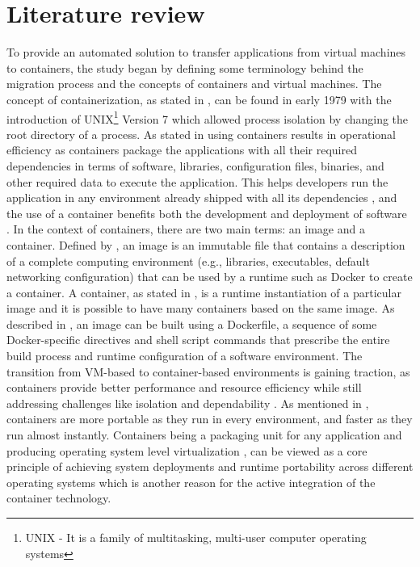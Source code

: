 \documentclass[twocolumn]{article}
\begin{document}
\section{Literature review}
To provide an automated solution to transfer applications from virtual machines to containers, the study began by defining some terminology behind the migration process and the concepts of containers and virtual machines.
The concept of containerization, as stated in \cite{Bhat-2022}, can be found in early 1979 with the introduction of UNIX\footnote{UNIX - It is a family of multitasking, multi-user computer operating systems} Version 7 which allowed process isolation by changing the root directory of a process. As stated in \cite{SiddiquiEtAl-2020} using containers results in operational efficiency as containers package the applications with all their required dependencies in terms of software, libraries, configuration files, binaries, and other required data to execute the application. This helps developers run the application in any environment already shipped with all its dependencies \cite{SiddiquiEtAl-2020}, and the use of a container benefits both the development and deployment of software \cite{VermaEtAl-2022}. In the context of containers, there are two main terms: an image and a container. Defined by \cite{HaleEtAl-2017}, an image is an immutable file that contains a description of a complete computing environment (e.g., libraries, executables, default networking configuration) that can be used by a runtime such as Docker to create a container. A container, as stated in \cite{HaleEtAl-2017}, is a runtime instantiation of a particular image and it is possible to have many containers based on the same image. As described in \cite{HaleEtAl-2017}, an image can be built using a Dockerfile, a sequence of some Docker-specific directives and shell script commands that prescribe the entire build process and runtime configuration of a software environment.
The transition from VM-based to container-based environments is gaining traction, as containers provide better performance and resource efficiency while still addressing challenges like isolation and dependability \cite{GargEtAl-2024}. As mentioned in \cite{Yade-2022}, containers are more portable as they run in every environment, and faster as they run almost instantly. Containers being a packaging unit for any application and producing operating system level virtualization \cite{SiddiquiEtAl-2020}, can be viewed as a core principle of achieving system deployments and runtime portability across different operating systems which is another reason for the active integration of the container technology.
\end{document}
